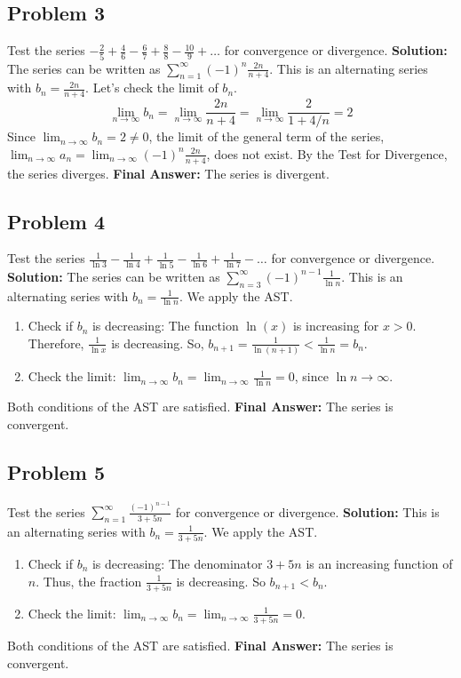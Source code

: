 \documentclass{article}
\begin{document}
\subsection*{Problem 3}
Test the series $-\frac{2}{5} + \frac{4}{6} - \frac{6}{7} + \frac{8}{8} - \frac{10}{9} + \dots$ for convergence or divergence.
\textbf{Solution:} The series can be written as $\sum_{n=1}^{\infty} (-1)^{n} \frac{2n}{n+4}$. This is an alternating series with $b_n = \frac{2n}{n+4}$. Let's check the limit of $b_n$.
\[ \lim_{n \to \infty} b_n = \lim_{n \to \infty} \frac{2n}{n+4} = \lim_{n \to \infty} \frac{2}{1+4/n} = 2 \]
Since $\lim_{n \to \infty} b_n = 2 \neq 0$, the limit of the general term of the series, $\lim_{n \to \infty} a_n = \lim_{n \to \infty} (-1)^n \frac{2n}{n+4}$, does not exist. By the Test for Divergence, the series diverges.
\textbf{Final Answer:} The series is divergent.

\subsection*{Problem 4}
Test the series $\frac{1}{\ln 3} - \frac{1}{\ln 4} + \frac{1}{\ln 5} - \frac{1}{\ln 6} + \frac{1}{\ln 7} - \dots$ for convergence or divergence.
\textbf{Solution:} The series can be written as $\sum_{n=3}^{\infty} (-1)^{n-1} \frac{1}{\ln n}$. This is an alternating series with $b_n = \frac{1}{\ln n}$. We apply the AST.
\begin{enumerate}
    \item Check if $b_n$ is decreasing: The function $\ln(x)$ is increasing for $x>0$. Therefore, $\frac{1}{\ln x}$ is decreasing. So, $b_{n+1} = \frac{1}{\ln(n+1)} < \frac{1}{\ln n} = b_n$.
    \item Check the limit: $\lim_{n \to \infty} b_n = \lim_{n \to \infty} \frac{1}{\ln n} = 0$, since $\ln n \to \infty$.
\end{enumerate}
Both conditions of the AST are satisfied.
\textbf{Final Answer:} The series is convergent.

\subsection*{Problem 5}
Test the series $\sum_{n=1}^{\infty} \frac{(-1)^{n-1}}{3+5n}$ for convergence or divergence.
\textbf{Solution:} This is an alternating series with $b_n = \frac{1}{3+5n}$. We apply the AST.
\begin{enumerate}
    \item Check if $b_n$ is decreasing: The denominator $3+5n$ is an increasing function of $n$. Thus, the fraction $\frac{1}{3+5n}$ is decreasing. So $b_{n+1} < b_n$.
    \item Check the limit: $\lim_{n \to \infty} b_n = \lim_{n \to \infty} \frac{1}{3+5n} = 0$.
\end{enumerate}
Both conditions of the AST are satisfied.
\textbf{Final Answer:} The series is convergent.
\end{document}
